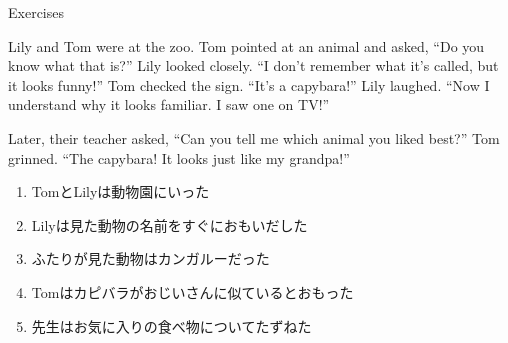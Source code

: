 \documentclass[aspectratio=169,xcolor={dvipsnames,table}]{beamer}
\begin{document}
\begin{frame}[plain]{Exercises}
\small
\begin{tcolorbox}[colframe=ForestGreen,
  colback=ForestGreen!10!white,
  colbacktitle=ForestGreen!40!white,
  coltitle=black, %
  before upper={\setlength{\parindent}{1.5em}},
  title=英文を読んで、問に答えましょう\hfill{\scriptsize \myaudio{./audio/055_indirect_question_06.mp3}}
]
Lily and Tom were at the zoo.
Tom pointed at an animal and asked, ``Do you know what that is?''
Lily looked closely. ``I don't remember what it's called, but it looks funny!''
Tom checked the sign. ``It's a capybara!''
Lily laughed. ``Now I understand why it looks familiar. I saw one on TV!''

Later, their teacher asked, ``Can you tell me which animal you liked best?''
Tom grinned. ``The capybara! It looks just like my grandpa!''
\end{tcolorbox}
\vspace{-3pt}
\begin{enumerate}\scriptsize\setlength{\itemsep}{-2pt}
 \item<2-> TomとLilyは動物園にいった\hfill{}
 \item<2-> Lilyは見た動物の名前をすぐにおもいだした\hfill\visible<6->{F}
 \item<2-> ふたりが見た動物はカンガルーだった\hfill{}
 \item<2-> Tomはカピバラがおじいさんに似ているとおもった\hfill{}
 \item<2-> 先生はお気に入りの食べ物についてたずねた\hfill{}
\end{enumerate}


\end{frame}
\end{document}
